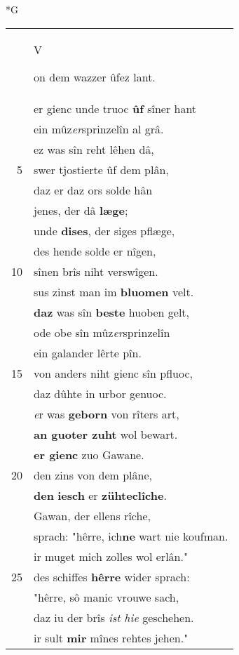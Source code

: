 \documentclass[8pt,a4paper,notitlepage]{article}
\begin{document}
\begin{table}[ht]
\begin{minipage}[t]{0.5\linewidth}
\small
\begin{center}*G
\end{center}
\begin{tabular}{rl}
 & \begin{large}V\end{large}on dem wazzer ûfez lant.\\ 
 & er gienc unde truoc \textbf{ûf} sîner hant\\ 
 & ein mûz\textit{er}sprinzelîn al grâ.\\ 
 & ez was sîn reht lêhen dâ,\\ 
5 & swer tjostierte ûf dem plân,\\ 
 & daz er daz ors solde hân\\ 
 & jenes, der dâ \textbf{læge};\\ 
 & unde \textbf{dises}, der siges pflæge,\\ 
 & des hende solde er nîgen,\\ 
10 & sînen brîs niht verswîgen.\\ 
 & sus zinst man im \textbf{bluomen} velt.\\ 
 & \textbf{daz} was sîn \textbf{beste} huoben gelt,\\ 
 & ode obe sîn mûz\textit{er}sprinzelîn\\ 
 & ein galander lêrte pîn.\\ 
15 & von anders niht gienc sîn pfluoc,\\ 
 & daz dûhte in urbor genuoc.\\ 
 & \textit{e}r was \textbf{geborn} von rîters art,\\ 
 & \textbf{an guoter zuht} wol bewart.\\ 
 & \textbf{er gienc} zuo Gawane.\\ 
20 & den zins von dem plâne,\\ 
 & \textbf{den} \textbf{iesch} er \textbf{zühteclîche}.\\ 
 & Gawan, der ellens rîche,\\ 
 & sprach: "hêrre, ich\textbf{ne} wart nie koufman.\\ 
 & ir muget mich zolles wol erlân."\\ 
25 & des schiffes \textbf{hêrre} wider sprach:\\ 
 & "hêrre, sô manic vrouwe sach,\\ 
 & daz iu der brîs \textit{ist hie} geschehen.\\ 
 & ir sult \textbf{mir} mînes rehtes jehen."\\ 

\end{tabular}
\end{minipage}
\end{table}
\end{document}
